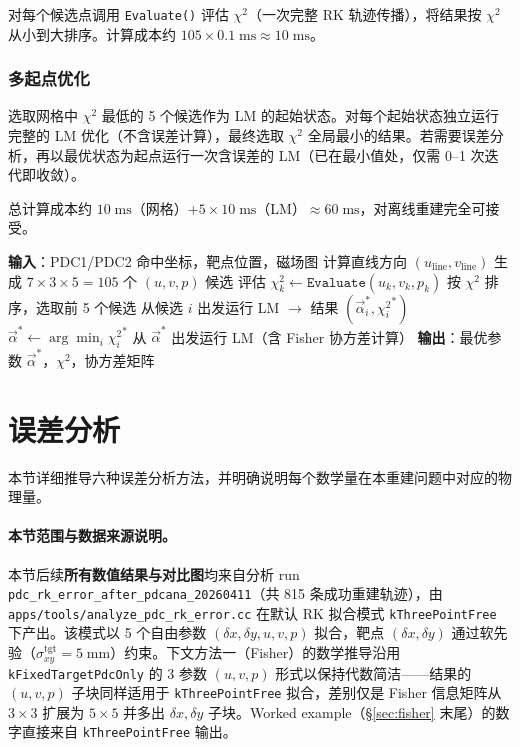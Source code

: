 \documentclass[a4paper, 11pt]{article}
\begin{document}
对每个候选点调用 \texttt{Evaluate()} 评估 $\chi^2$（一次完整 RK 轨迹传播），将结果按 $\chi^2$ 从小到大排序。计算成本约 $105 \times 0.1\;\mathrm{ms} \approx 10\;\mathrm{ms}$。

\subsubsection{多起点优化}

选取网格中 $\chi^2$ 最低的 5 个候选作为 LM 的起始状态。对每个起始状态独立运行完整的 LM 优化（不含误差计算），最终选取 $\chi^2$ 全局最小的结果。若需要误差分析，再以最优状态为起点运行一次含误差的 LM（已在最小值处，仅需 0--1 次迭代即收敛）。

总计算成本约 $10\;\mathrm{ms}$（网格）$+ 5 \times 10\;\mathrm{ms}$（LM）$\approx 60\;\mathrm{ms}$，对离线重建完全可接受。

\begin{algorithm}[H]
\caption{多起点 RK 动量重建}
\label{alg:multistart}
\begin{algorithmic}[1]
\State \textbf{输入}：PDC1/PDC2 命中坐标，靶点位置，磁场图
\State 计算直线方向 $(u_\mathrm{line}, v_\mathrm{line})$
\State 生成 $7 \times 3 \times 5 = 105$ 个 $(u, v, p)$ 候选
  \State 评估 $\chi^2_k \gets \texttt{Evaluate}(u_k, v_k, p_k)$
\EndFor
\State 按 $\chi^2$ 排序，选取前 5 个候选
  \State 从候选 $i$ 出发运行 LM $\to$ 结果 $(\vec{\alpha}_i^{*}, {\chi^2_i}^{*})$
\EndFor
\State $\vec{\alpha}^{*} \gets \arg\min_i {\chi^2_i}^{*}$
  \State 从 $\vec{\alpha}^*$ 出发运行 LM（含 Fisher 协方差计算）
\EndIf
\State \textbf{输出}：最优参数 $\vec{\alpha}^{*}$，$\chi^2$，协方差矩阵
\end{algorithmic}
\end{algorithm}

\section{误差分析}
\label{sec:error}

本节详细推导六种误差分析方法，并明确说明每个数学量在本重建问题中对应的物理量。

\paragraph{本节范围与数据来源说明。}
本节后续\textbf{所有数值结果与对比图}均来自分析 run \texttt{pdc\_rk\_error\_after\_pdcana\_20260411}（共 815 条成功重建轨迹），由 \texttt{apps/tools/analyze\_pdc\_rk\_error.cc} 在默认 RK 拟合模式 \texttt{kThreePointFree} 下产出。该模式以 5 个自由参数 $(\delta x, \delta y, u, v, p)$ 拟合，靶点 $(\delta x, \delta y)$ 通过软先验（$\sigma_{xy}^\mathrm{tgt}=5\;\mathrm{mm}$）约束。下文方法一（Fisher）的数学推导沿用 \texttt{kFixedTargetPdcOnly} 的 3 参数 $(u,v,p)$ 形式以保持代数简洁——结果的 $(u,v,p)$ 子块同样适用于 \texttt{kThreePointFree} 拟合，差别仅是 Fisher 信息矩阵从 $3{\times}3$ 扩展为 $5{\times}5$ 并多出 $\delta x,\delta y$ 子块。Worked example（\S\ref{sec:fisher} 末尾）的数字直接来自 \texttt{kThreePointFree} 输出。
\end{document}
